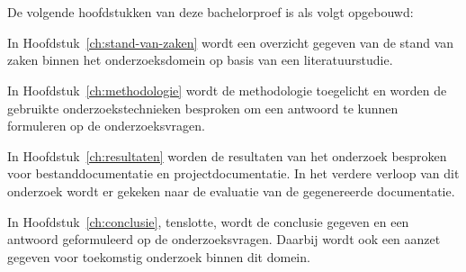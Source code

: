 \section{}%
\label{sec:opzet-bachelorproef}


De volgende hoofdstukken van deze bachelorproef is als volgt opgebouwd:

In Hoofdstuk~\ref{ch:stand-van-zaken} wordt een overzicht gegeven van de stand van zaken binnen het onderzoeksdomein op basis van een literatuurstudie.

In Hoofdstuk~\ref{ch:methodologie} wordt de methodologie toegelicht en worden de gebruikte onderzoekstechnieken besproken om een antwoord te kunnen formuleren op de onderzoeksvragen.


In Hoofdstuk~\ref{ch:resultaten} worden de resultaten van het onderzoek besproken voor bestanddocumentatie en projectdocumentatie.
In het verdere verloop van dit onderzoek wordt er gekeken naar de evaluatie van de gegenereerde documentatie.

In Hoofdstuk~\ref{ch:conclusie}, tenslotte, wordt de conclusie gegeven en een antwoord geformuleerd op de onderzoeksvragen. Daarbij wordt ook een aanzet gegeven voor toekomstig onderzoek binnen dit domein.